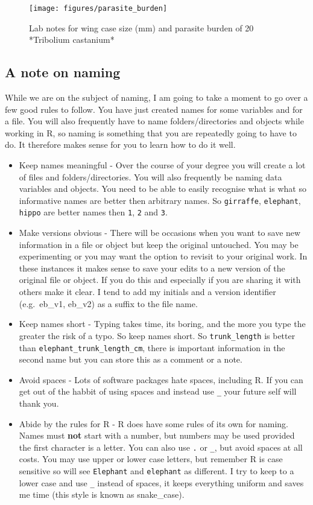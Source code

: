 \documentclass[
]{book}
\begin{document}
\begin{figure}
\texttt{[image: figures/parasite\_burden]} \caption{Lab notes for wing case size (mm) and parasite burden of 20 *Tribolium castanium*}\label{fig:unnamed-chunk-25}
\end{figure}

\hypertarget{a-note-on-naming}{%
\subsection{A note on naming}\label{a-note-on-naming}}

While we are on the subject of naming, I am going to take a moment to go over a few good rules to follow. You have just created names for some variables and for a file. You will also frequently have to name folders/directories and objects while working in R, so naming is something that you are repeatedly going to have to do. It therefore makes sense for you to learn how to do it well.

\begin{itemize}
\item
  Keep names meaningful - Over the course of your degree you will create a lot of files and folders/directories. You will also frequently be naming data variables and objects. You need to be able to easily recognise what is what so informative names are better then arbitrary names. So \texttt{girraffe}, \texttt{elephant}, \texttt{hippo} are better names then \texttt{1}, \texttt{2} and \texttt{3}.
\item
  Make versions obvious - There will be occasions when you want to save new information in a file or object but keep the original untouched. You may be experimenting or you may want the option to revisit to your original work. In these instances it makes sense to save your edits to a new version of the original file or object. If you do this and especially if you are sharing it with others make it clear. I tend to add my initials and a version identifier (e.g.~eb\_v1, eb\_v2) as a suffix to the file name.
\item
  Keep names short - Typing takes time, its boring, and the more you type the greater the risk of a typo. So keep names short. So \texttt{trunk\_length} is better than \texttt{elephant\_trunk\_length\_cm}, there is important information in the second name but you can store this as a comment or a note.
\item
  Avoid spaces - Lots of software packages hate spaces, including R. If you can get out of the habbit of using spaces and instead use \texttt{\_} your future self will thank you.
\item
  Abide by the rules for R - R does have some rules of its own for naming. Names must \textbf{not} start with a number, but numbers may be used provided the first character is a letter. You can also use \texttt{.} or \texttt{\_}, but avoid spaces at all costs. You may use upper or lower case letters, but remember R is case sensitive so will see \texttt{Elephant} and \texttt{elephant} as different. I try to keep to a lower case and use \texttt{\_} instead of spaces, it keeps everything uniform and saves me time (this style is known as snake\_case).
\end{itemize}
\end{document}

